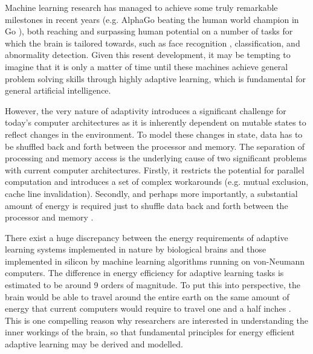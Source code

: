 Machine learning research has managed to achieve some truly remarkable milestones in recent years (e.g. AlphaGo beating the human world champion in Go \cite{alphago}), both reaching and surpassing human potential on a number of tasks for which the brain is tailored towards, such as face recognition \cite{facenet}, classification, and abnormality detection. Given this resent development, it may be tempting to imagine that it is only a matter of time until these machines achieve general problem solving skills through highly adaptive learning, which is fundamental for general artificial intelligence.

However, the very nature of adaptivity introduces a significant challenge for today's computer architectures as it is inherently dependent on mutable states to reflect changes in the environment. To model these changes in state, data has to be shuffled back and forth between the processor and memory. The separation of processing and memory access is the underlying cause of two significant problems with current computer architectures. Firstly, it restricts the potential for parallel computation \cite{net_doing_all_the_work} and introduces a set of complex workarounds (e.g. mutual exclusion, cache line invalidation). Secondly, and perhaps more importantly, a substantial amount of energy is required just to shuffle data back and forth between the processor and memory \cite{ahah}.

There exist a huge discrepancy between the energy requirements of adaptive learning systems implemented in nature by biological brains and those implemented in silicon by machine learning algorithms running on von-Neumann computers. The difference in energy efficiency for adaptive learning tasks is estimated to be around 9 orders of magnitude. To put this into perspective, the brain would be able to travel around the entire earth on the same amount of energy that current computers would require to travel one and a half inches \cite{memristors_a_new_frontier}. This is one compelling reason why researchers are interested in understanding the inner workings of the brain, so that fundamental principles for energy efficient adaptive learning may be derived and modelled.



